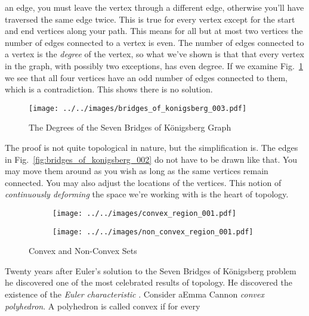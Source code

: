     an edge, you must leave the vertex through a different edge,
    otherwise you'll have traversed the same edge twice. This is true for every
    vertex except for the start and end vertices along your path. This means for
    all but at most two vertices the number of edges connected to a vertex is
    even. The number of edges connected to a vertex is the \textit{degree} of
    the vertex, so what we've shown is that that every vertex in the graph,
    with possibly two exceptions, has even degree. If we examine
    Fig.~\ref{fig:bridges_of_konigsberg_003} we see that all four vertices
    have an odd number of edges connected to them, which is a contradiction.
    This shows there is no solution.
    \begin{figure}[H]
        \centering
        \texttt{[image: ../../images/bridges\_of\_konigsberg\_003.pdf]}
        \caption{The Degrees of the Seven Bridges of K\"{o}nigsberg Graph}
        \label{fig:bridges_of_konigsberg_003}
    \end{figure}
    The proof is not quite topological in nature, but the simplification is.
    The edges in Fig.~\ref{fig:bridges_of_konigsberg_002} do not have to be
    drawn like that. You may move them around as you wish as long as the same
    vertices remain connected. You may also adjust the locations of the
    vertices. This notion of \textit{continuously deforming} the space we're
    working with is the heart of topology.
    \par\hfill\par
    \begin{figure}
        \centering
        \begin{subfigure}[b]{0.49\textwidth}
            \texttt{[image: ../../images/convex\_region\_001.pdf]}
        \end{subfigure}
        \hfill
        \begin{subfigure}[b]{0.49\textwidth}
            \texttt{[image: ../../images/non\_convex\_region\_001.pdf]}
        \end{subfigure}
        \caption{Convex and Non-Convex Sets}
        \label{fig:convex_and_non_convex}
    \end{figure}
    Twenty years after Euler's solution to the Seven Bridges of K\"{o}nigsberg
    problem he discovered one of the most celebrated results of topology. He
    discovered the existence of the \textit{Euler characteristic}%
    . Consider aEmma Cannon
    \textit{convex polyhedron}. A polyhedron is called convex if for every
